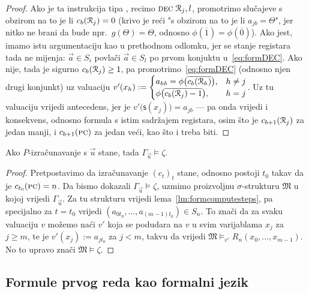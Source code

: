 \begin{proof}
Ako je ta instrukcija tipa \dec, recimo $\textsc{dec}\;\mathcal R_{j},l$, promotrimo slučajeve s obzirom na to je li $c_b(\mathcal R_{j})=0$ (krivo je reći "s obzirom na to je li $a_{jb}=\Theta$", jer nitko ne brani da bude npr.\ $g(\Theta)=\Theta$, odnosno $\phi(\overline1)=\phi(\overline0)$). Ako jest, imamo istu argumentaciju kao u prethodnom odlomku, jer se stanje registara tada ne mijenja: $\vec a\in S_i$ povlači $\vec a\in S_l$ po prvom konjuktu u~\eqref{eq:formDEC}. Ako nije, tada je sigurno $c_b(\mathcal R_{j})\ge1$, pa promotrimo~\eqref{eq:formDEC} (odnosno njen drugi konjunkt) uz valuaciju
$v'(x_h):=\begin{cases}
a_{hb}=\phi\bigl(\overline{c_b(\mathcal R_{h})}\bigr),&h\ne j\\
\phi\bigl(\overline{c_b(\mathcal R_{j})-1}\bigr),&h=j
\end{cases}$.
Uz tu valuaciju vrijedi antecedens, jer je $v'\bigl(\mathsf s(x_j)\bigr)=a_{jb}$ --- pa onda vrijedi i konsekvens, odnosno formula s istim sadržajem registara, osim što je $c_{b+1}(\mathcal R_{j})$ za jedan manji, i $c_{b+1}(\textsc{pc})$ za jedan veći, kao što i treba biti.
\end{proof}

\begin{propozicija}[{name=[zaustavljanje povlači zaključivanje]}]\label{pp:stop>models}
Ako $P$-izračunavanje s $\vec u$ stane, tada $\Gamma_{\vec u}\models\zeta$.
\end{propozicija}
\begin{proof}
Pretpostavimo da izračunavanje $(c_t)_t$ stane, odnosno postoji $t_0$ takav da je $c_{t_0}(\textsc{pc})=n$. Da bismo dokazali $\Gamma_{\vec u}\models\zeta$, uzmimo proizvoljnu $\sigma$-strukturu $\mathfrak M$ u kojoj vrijedi $\Gamma_{\vec u}$. Za tu strukturu vrijedi lema~\ref{lm:formcomputesteps}, pa specijalno za $t=t_0$ vrijedi $(a_{0t_0},\dotsc,a_{(m-1)t_0})\in S_n$. To znači da za svaku valuaciju $v$ možemo naći $v'$ koja se podudara na $v$ u svim varijablama $x_j$ za $j\ge m$, te je $v'(x_j):=a_{jt_0}$ za $j<m$, takvu da vrijedi $\mathfrak M\models_{v'}R_n(x_0,\dotsc,x_{m-1})$. No to upravo znači $\mathfrak M\models\zeta$.
\end{proof}


\subsection{Formule prvog reda kao formalni jezik}

